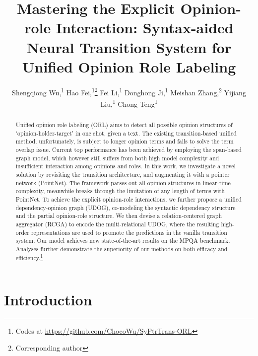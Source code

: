 \documentclass[letterpaper]{article} \usepackage{aaai22}  \usepackage{times}  \usepackage{helvet}  \usepackage{courier}  \usepackage[hyphens]{url}  \usepackage{graphicx} \urlstyle{rm} \def\UrlFont{\rm}  \usepackage{natbib}  \usepackage{caption} \DeclareCaptionStyle{ruled}{labelfont=normalfont,labelsep=colon,strut=off} \frenchspacing  \setlength{\pdfpagewidth}{8.5in}  \setlength{\pdfpageheight}{11in}  \usepackage{algorithm}
\title{Mastering the Explicit Opinion-role Interaction: Syntax-aided Neural Transition System for Unified Opinion Role Labeling}
\author {
Shengqiong Wu,\textsuperscript{\rm 1}
    Hao Fei,\textsuperscript{\rm 1}\thanks{Corresponding author}
    Fei Li,\textsuperscript{\rm 1}
    Donghong Ji,\textsuperscript{\rm 1}
    Meishan Zhang,\textsuperscript{\rm 2}
    Yijiang Liu,\textsuperscript{\rm 1}
    Chong Teng\textsuperscript{\rm 1}
}
\begin{document}
\maketitle

\begin{abstract}
Unified opinion role labeling (ORL) aims to detect all possible opinion structures of `opinion-holder-target' in one shot, given a text.
The existing transition-based unified method, unfortunately, is subject to longer opinion terms and fails to solve the term overlap issue.
Current top performance has been achieved by employing the span-based graph model, which however still suffers from both high model complexity and insufficient interaction among opinions and roles.
In this work, we investigate a novel solution by revisiting the transition architecture, and augmenting it with a pointer network (PointNet).
The framework parses out all opinion structures in linear-time complexity, meanwhile breaks through the limitation of any length of terms with PointNet.
To achieve the explicit opinion-role interactions, we further propose a unified dependency-opinion graph (UDOG), co-modeling the syntactic dependency structure and the partial opinion-role structure.
We then devise a relation-centered graph aggregator (RCGA) to encode the multi-relational UDOG, where the resulting high-order representations are used to promote the predictions in the vanilla transition system.
Our model achieves new state-of-the-art results on the MPQA benchmark.
Analyses further demonstrate the superiority of our methods on both efficacy and efficiency.\footnote{Codes at \url{https://github.com/ChocoWu/SyPtrTrans-ORL}}
\end{abstract}














\section{Introduction}
\end{document}
